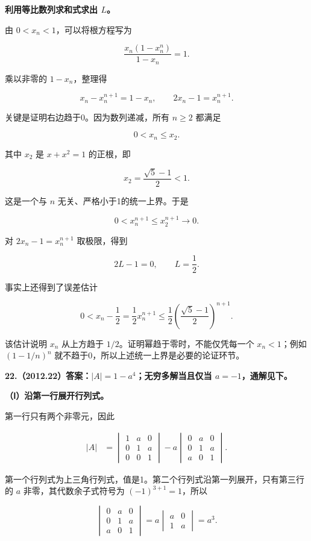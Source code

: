 \documentclass[UTF8,11pt,fontset=windows]{ctexart}
\begin{document}
\textbf{利用等比数列求和式求出 $L$。}

由 $0<x_n<1$，可以将根方程写为

$$
\frac{x_n(1-x_n^n)}{1-x_n}=1.
$$

乘以非零的 $1-x_n$，整理得

$$
x_n-x_n^{n+1}=1-x_n,
\qquad2x_n-1=x_n^{n+1}.
$$

关键是证明右边趋于0。因为数列递减，所有 $n\ge2$ 都满足

$$
0<x_n\le x_2.
$$

其中 $x_2$ 是 $x+x^2=1$ 的正根，即

$$
x_2=\frac{\sqrt5-1}{2}<1.
$$

这是一个与 $n$ 无关、严格小于1的统一上界。于是

$$
0<x_n^{n+1}\le x_2^{n+1}\longrightarrow0.
$$

对 $2x_n-1=x_n^{n+1}$ 取极限，得到

$$
2L-1=0,
\qquad L=\frac12.
$$

事实上还得到了误差估计

$$
0<x_n-\frac12=\frac12x_n^{n+1}
\le\frac12\left(\frac{\sqrt5-1}{2}\right)^{n+1}.
$$

该估计说明 $x_n$ 从上方趋于 $1/2$。证明幂趋于零时，不能仅凭每一个 $x_n<1$；例如 $(1-1/n)^n$ 就不趋于0，所以上述统一上界是必要的论证环节。

\clearpage

\textbf{22.（2012.22）答案：$|A|=1-a^4$；无穷多解当且仅当 $a=-1$，通解见下。}

\textbf{（Ⅰ）沿第一行展开行列式。}

第一行只有两个非零元，因此

$$
\begin{aligned}
|A|
&=\begin{vmatrix}1&a&0\\0&1&a\\0&0&1\end{vmatrix}
-a\begin{vmatrix}0&a&0\\0&1&a\\a&0&1\end{vmatrix}.
\end{aligned}
$$

第一个行列式为上三角行列式，值是1。第二个行列式沿第一列展开，只有第三行的 $a$ 非零，其代数余子式符号为 $(-1)^{3+1}=1$，所以

$$
\begin{vmatrix}0&a&0\\0&1&a\\a&0&1\end{vmatrix}
=a\begin{vmatrix}a&0\\1&a\end{vmatrix}=a^3.
$$
\end{document}
